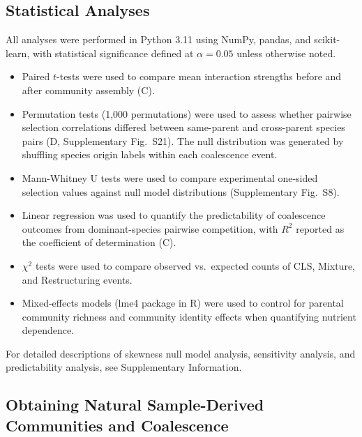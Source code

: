 \subsection*{Statistical Analyses}
\label{sec:methods:statistics}

All analyses were performed in Python 3.11 using NumPy, pandas, and scikit-learn, with statistical significance defined at $\alpha = 0.05$ unless otherwise noted.

\begin{itemize}
    \item Paired $t$-tests were used to compare mean interaction strengths before and after community assembly (C).
    \item Permutation tests (1,000 permutations) were used to assess whether pairwise selection correlations differed between same-parent and cross-parent species pairs (D, Supplementary Fig.~S21). The null distribution was generated by shuffling species origin labels within each coalescence event.
    \item Mann-Whitney U tests were used to compare experimental one-sided selection values against null model distributions (Supplementary Fig.~S8).
    \item Linear regression was used to quantify the predictability of coalescence outcomes from dominant-species pairwise competition, with $R^2$ reported as the coefficient of determination (C).
    \item $\chi^2$ tests were used to compare observed vs.\ expected counts of CLS, Mixture, and Restructuring events.
    \item Mixed-effects models (lme4 package in R) were used to control for parental community richness and community identity effects when quantifying nutrient dependence.
\end{itemize}

For detailed descriptions of skewness null model analysis, sensitivity analysis, and predictability analysis, see Supplementary Information.


\subsection*{Obtaining Natural Sample-Derived Communities and Coalescence}
\label{sec:methods:natural}

